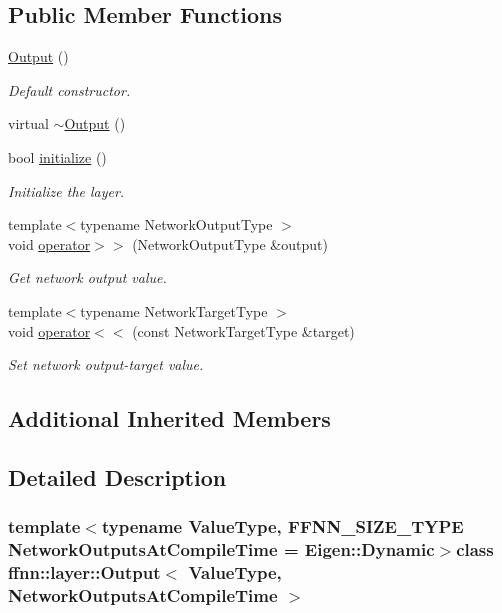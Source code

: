 \subsection*{Public Member Functions}
\begin{DoxyCompactItemize}
\item 
\hyperlink{classffnn_1_1layer_1_1_output_af7d5b0ae4ac072ada556478a12fe235f}{Output} ()
\begin{DoxyCompactList}\small\item\em Default constructor. \end{DoxyCompactList}\item 
virtual \hyperlink{classffnn_1_1layer_1_1_output_a7e835ff550e291d2015efb76290c1b6c}{$\sim$\-Output} ()
\item 
bool \hyperlink{classffnn_1_1layer_1_1_output_ab9ebd05595bc6b75718191aa48e70ad2}{initialize} ()
\begin{DoxyCompactList}\small\item\em Initialize the layer. \end{DoxyCompactList}\item 
{\footnotesize template$<$typename Network\-Output\-Type $>$ }\\void \hyperlink{classffnn_1_1layer_1_1_output_a2f4eb5c36b8b5d486410366b4cd9e7a8}{operator$>$$>$} (Network\-Output\-Type \&output)
\begin{DoxyCompactList}\small\item\em Get network output value. \end{DoxyCompactList}\item 
{\footnotesize template$<$typename Network\-Target\-Type $>$ }\\void \hyperlink{classffnn_1_1layer_1_1_output_ab37eb595864f42089dc2d0556b1f68ef}{operator$<$$<$} (const Network\-Target\-Type \&target)
\begin{DoxyCompactList}\small\item\em Set network output-\/target value. \end{DoxyCompactList}\end{DoxyCompactItemize}
\subsection*{Additional Inherited Members}


\subsection{Detailed Description}
\subsubsection*{template$<$typename Value\-Type, F\-F\-N\-N\-\_\-\-S\-I\-Z\-E\-\_\-\-T\-Y\-P\-E Network\-Outputs\-At\-Compile\-Time = Eigen\-::\-Dynamic$>$class ffnn\-::layer\-::\-Output$<$ Value\-Type, Network\-Outputs\-At\-Compile\-Time $>$}

